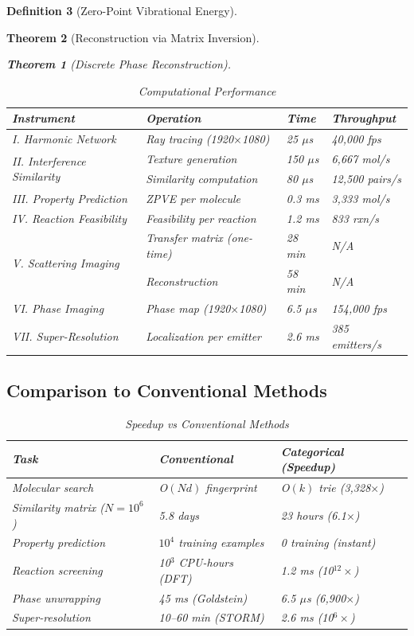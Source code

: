 \documentclass[11pt,a4paper]{article}
\newtheorem{theorem}{Theorem}[section]
\theoremstyle{definition}
\newtheorem{definition}[theorem]{Definition}
\theoremstyle{remark}
\begin{document}
\begin{definition}[Zero-Point Vibrational Energy]
\begin{theorem}[Reconstruction via Matrix Inversion]
\begin{theorem}[Discrete Phase Reconstruction]
\begin{table}[h]
\centering
\caption{Computational Performance}
\label{tab:performance}
\begin{tabular}{llll}
\toprule
\textbf{Instrument} & \textbf{Operation} & \textbf{Time} & \textbf{Throughput} \\
\midrule
I. Harmonic Network & Ray tracing (1920$\times$1080) & 25 $\mu$s & 40,000 fps \\
\midrule
\multirow{2}{*}{II. Interference Similarity} & Texture generation & 150 $\mu$s & 6,667 mol/s \\
& Similarity computation & 80 $\mu$s & 12,500 pairs/s \\
\midrule
III. Property Prediction & ZPVE per molecule & 0.3 ms & 3,333 mol/s \\
\midrule
IV. Reaction Feasibility & Feasibility per reaction & 1.2 ms & 833 rxn/s \\
\midrule
\multirow{2}{*}{V. Scattering Imaging} & Transfer matrix (one-time) & 28 min & N/A \\
& Reconstruction & 58 min & N/A \\
\midrule
VI. Phase Imaging & Phase map (1920$\times$1080) & 6.5 $\mu$s & 154,000 fps \\
\midrule
VII. Super-Resolution & Localization per emitter & 2.6 ms & 385 emitters/s \\
\bottomrule
\end{tabular}
\end{table}

\subsection{Comparison to Conventional Methods}

\begin{table}[h]
\centering
\caption{Speedup vs Conventional Methods}
\label{tab:speedup}
\begin{tabular}{lll}
\toprule
\textbf{Task} & \textbf{Conventional} & \textbf{Categorical (Speedup)} \\
\midrule
Molecular search & O$(Nd)$ fingerprint & O$(k)$ trie (3,328$\times$) \\
Similarity matrix ($N=10^6$) & 5.8 days & 23 hours (6.1$\times$) \\
Property prediction & $10^4$ training examples & 0 training (instant) \\
Reaction screening & 10$^3$ CPU-hours (DFT) & 1.2 ms (10$^{12}\times$) \\
Phase unwrapping & 45 ms (Goldstein) & 6.5 $\mu$s (6,900$\times$) \\
Super-resolution & 10--60 min (STORM) & 2.6 ms (10$^6\times$) \\
\bottomrule
\end{tabular}
\end{table}


\end{theorem}
\end{theorem}
\end{definition}
\end{document}
